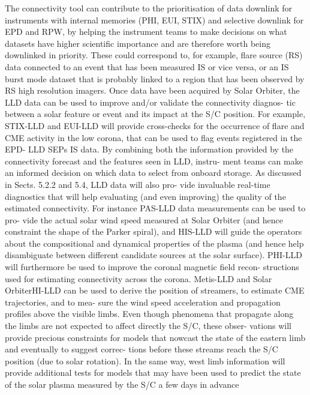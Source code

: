 \documentclass[preprint,11pt]{elsarticle}
\begin{document}
The connectivity tool can contribute to the prioritisation of data
downlink for instruments with internal memories (PHI, EUI,
STIX) and selective downlink for EPD and RPW, by helping the
instrument teams to make decisions on what datasets have higher
scientific importance and are therefore worth being downlinked
in priority. These could correspond to, for example, flare source
(RS) data connected to an event that has been measured IS or
vice versa, or an IS burst mode dataset that is probably linked to
a region that has been observed by RS high resolution imagers.
Once data have been acquired by Solar Orbiter, the LLD data
can be used to improve and/or validate the connectivity diagnos-
tic between a solar feature or event and its impact at the S/C
position. For example, STIX-LLD and EUI-LLD will provide
cross-checks for the occurrence of flare and CME activity in the
low corona, that can be used to flag events registered in the EPD-
LLD SEPs IS data. By combining both the information provided
by the connectivity forecast and the features seen in LLD, instru-
ment teams can make an informed decision on which data to
select from onboard storage.
As discussed in Sects. 5.2.2 and 5.4, LLD data will also pro-
vide invaluable real-time diagnostics that will help evaluating
(and even improving) the quality of the estimated connectivity.
For instance PAS-LLD data measurements can be used to pro-
vide the actual solar wind speed measured at Solar Orbiter (and
hence constraint the shape of the Parker spiral), and HIS-LLD
will guide the operators about the compositional and dynamical
properties of the plasma (and hence help disambiguate between
different candidate sources at the solar surface). PHI-LLD will
furthermore be used to improve the coronal magnetic field recon-
structions used for estimating connectivity across the corona.
Metis-LLD and Solar OrbiterHI-LLD can be used to derive the
position of streamers, to estimate CME trajectories, and to mea-
sure the wind speed acceleration and propagation profiles above
the visible limbs. Even though phenomena that propagate along
the limbs are not expected to affect directly the S/C, these obser-
vations will provide precious constraints for models that nowcast
the state of the eastern limb and eventually to suggest correc-
tions before these streams reach the S/C position (due to solar
rotation). In the same way, west limb information will provide
additional tests for models that may have been used to predict
the state of the solar plasma measured by the S/C a few days in
advance
\end{document}
